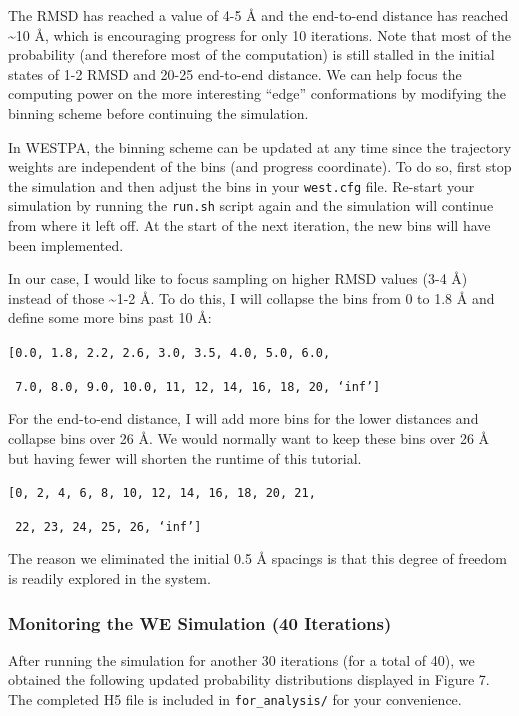 \documentclass[9pt,tutorial,pubversion]{livecoms}
\begin{document}
The RMSD has reached a value of 4-5 \AA{} and the end-to-end distance has reached \textasciitilde 10 \AA{}, which is encouraging progress for only 10 iterations. 
Note that most of the probability (and therefore most of the computation) is still stalled in the initial states of 1-2 RMSD and 20-25 end-to-end distance. 
We can help  focus the computing power on the more interesting “edge” conformations by modifying the binning scheme before continuing the simulation.
  
In WESTPA, the binning scheme can be updated at any time since the trajectory weights are independent of the bins (and progress coordinate). 
To do so, first stop the simulation and then adjust the bins in your \verb|west.cfg| file. 
Re-start your simulation by running the \verb|run.sh| script again and the simulation will continue from where it left off. 
At the start of the next iteration, the new bins will have been implemented.  

In our case, I would like to focus sampling on higher RMSD values (3-4 \AA) instead of those \textasciitilde 1-2 \AA. 
To do this, I will collapse the bins from 0 to 1.8 \AA{} and define some more bins past 10 \AA:

\verb|[0.0, 1.8, 2.2, 2.6, 3.0, 3.5, 4.0, 5.0, 6.0,|

\verb| 7.0, 8.0, 9.0, 10.0, 11, 12, 14, 16, 18, 20, ‘inf’]|

For the end-to-end distance, I will add more bins for the lower distances and collapse bins over 26 \AA. 
We would normally want to keep these bins over 26 \AA{} but having fewer will shorten the runtime of this tutorial.

\verb|[0, 2, 4, 6, 8, 10, 12, 14, 16, 18, 20, 21,|

\verb| 22, 23, 24, 25, 26, ‘inf’]|

The reason we eliminated the initial 0.5 \AA{} spacings is that this degree of freedom is readily explored in the system.

\subsubsection{Monitoring the WE Simulation (40 Iterations)}

After running the simulation for another 30 iterations (for a total of 40), we obtained the following updated probability distributions displayed in Figure 7.
The completed H5 file is included in \verb|for_analysis/| for your convenience.
\end{document}
